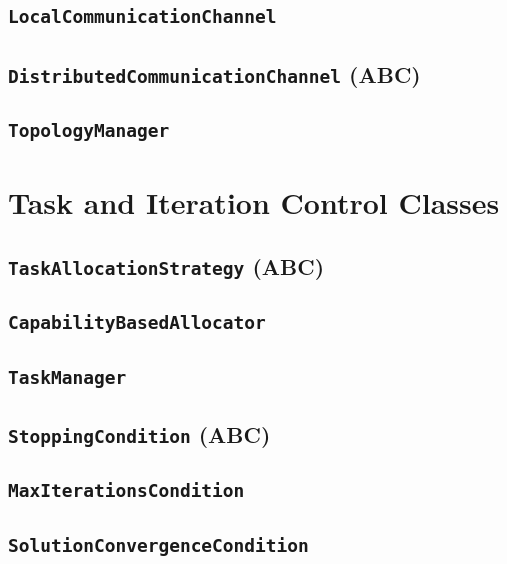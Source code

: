 \documentclass{amsbook}
\theoremstyle{definition}
\theoremstyle{remark}
\numberwithin{equation}{chapter} %
\begin{document}
        \subsection{\texttt{LocalCommunicationChannel}}
        \subsection{\texttt{DistributedCommunicationChannel} (ABC)}
        \subsection{\texttt{TopologyManager}}
    \section{Task and Iteration Control Classes}
        \subsection{\texttt{TaskAllocationStrategy} (ABC)}
        \subsection{\texttt{CapabilityBasedAllocator}}
        \subsection{\texttt{TaskManager}}
        \subsection{\texttt{StoppingCondition} (ABC)}
        \subsection{\texttt{MaxIterationsCondition}}
        \subsection{\texttt{SolutionConvergenceCondition}}
\end{document}
